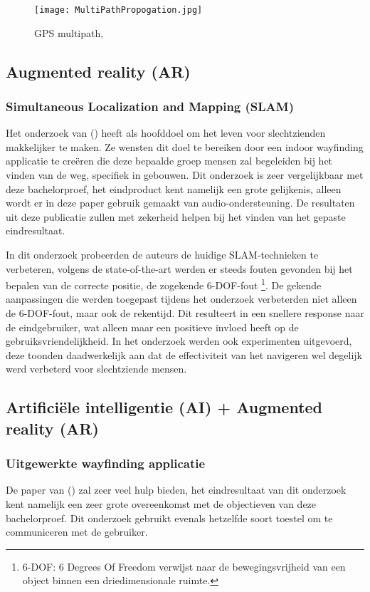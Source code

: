 \begin{figure}[H]
	\centering
	\texttt{[image: MultiPathPropogation.jpg]}
	\caption{GPS multipath, \autocite{Haikun2017}}
\end{figure}


\subsection{Augmented reality (AR)}

\subsubsection{Simultaneous Localization and Mapping (SLAM)}
Het onderzoek van \textcite{Zhang2017} () heeft als hoofddoel om het leven voor slechtzienden makkelijker te maken. Ze wensten dit doel te bereiken door een indoor wayfinding applicatie te creëren die deze bepaalde groep mensen zal begeleiden bij het vinden van de weg, specifiek in gebouwen. Dit onderzoek is zeer vergelijkbaar met deze bachelorproef, het eindproduct kent namelijk een grote gelijkenis, alleen wordt er in deze paper gebruik gemaakt van audio-ondersteuning. De resultaten uit deze publicatie zullen met zekerheid helpen bij het vinden van het gepaste eindresultaat.

In dit onderzoek probeerden de auteurs de huidige SLAM-technieken te verbeteren, volgens de state-of-the-art werden er steeds fouten gevonden bij het bepalen van de correcte positie, de zogekende 6-DOF-fout \footnote{6-DOF: 6 Degrees Of Freedom verwijst naar de bewegingsvrijheid van een object binnen een driedimensionale ruimte.}. De gekende aanpassingen die werden toegepast tijdens het onderzoek verbeterden niet alleen de 6-DOF-fout, maar ook de rekentijd. Dit resulteert in een snellere response naar de eindgebruiker, wat alleen maar een positieve invloed heeft op de gebruiksvriendelijkheid. In het onderzoek werden ook experimenten uitgevoerd, deze toonden daadwerkelijk aan dat de effectiviteit van het navigeren wel degelijk werd verbeterd voor slechtziende mensen.

\subsection{Artificiële intelligentie (AI) + Augmented reality (AR)}
\subsubsection{Uitgewerkte wayfinding applicatie}
De paper van \textcite{Pouria2016} () zal zeer veel hulp bieden, het eindresultaat van dit onderzoek kent namelijk een zeer grote overeenkomst met de objectieven van deze bachelorproef. Dit onderzoek gebruikt evenals hetzelfde soort toestel om te communiceren met de gebruiker.

